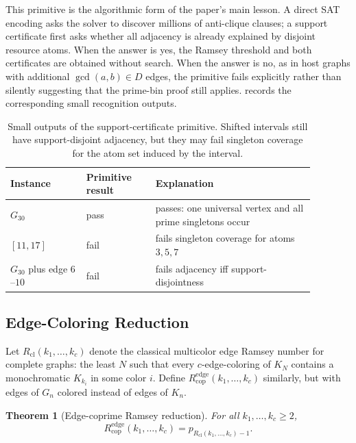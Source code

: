 \documentclass[11pt]{article}
\theoremstyle{plain}
\newtheorem{theorem}{Theorem}[section]
\theoremstyle{definition}
\theoremstyle{remark}
\newcommand{\Redge}{R_{\mathrm{cop}}^{\mathrm{edge}}}
\newcommand{\Rcl}{R_{\mathrm{cl}}}
\begin{document}
This primitive is the algorithmic form of the paper's main lesson.  A direct
SAT encoding asks the solver to discover millions of anti-clique clauses; a
support certificate first asks whether all adjacency is already explained by
disjoint resource atoms.  When the answer is yes, the Ramsey threshold and
both certificates are obtained without search.  When the answer is no, as in
host graphs with additional $\gcd(a,b)\in D$ edges, the primitive fails
explicitly rather than silently suggesting that the prime-bin proof still
applies.   records the corresponding small
recognition outputs.

\begin{table}[htbp]
\centering
\caption{Small outputs of the support-certificate primitive.  Shifted
intervals still have support-disjoint adjacency, but they may fail singleton
coverage for the atom set induced by the interval.}
\label{tab:support-primitive}
\small
\begin{tabular}{@{}>{\raggedright\arraybackslash}p{0.22\linewidth}>{\raggedright\arraybackslash}p{0.20\linewidth}>{\raggedright\arraybackslash}p{0.46\linewidth}@{}}
\toprule
Instance & Primitive result & Explanation \\
\midrule
$G_{30}$ & pass & passes: one universal vertex and all prime singletons occur \\
$[11,17]$ & fail & fails singleton coverage for atoms $3,5,7$ \\
$G_{30}$ plus edge $6$--$10$ & fail & fails adjacency iff support-disjointness \\
\bottomrule
\end{tabular}

\end{table}

\subsection{Edge-Coloring Reduction}

Let $\Rcl(k_1,\ldots,k_c)$ denote the classical multicolor edge Ramsey number
for complete graphs: the least $N$ such that every $c$-edge-coloring of
$K_N$ contains a monochromatic $K_{k_i}$ in some color $i$.  Define
$\Redge(k_1,\ldots,k_c)$ similarly, but with edges of $G_n$ colored instead
of edges of $K_n$.

\begin{theorem}[Edge-coprime Ramsey reduction]
\label{thm:edge-reduction}
For all $k_1,\ldots,k_c\ge 2$,
\[
  \Redge(k_1,\ldots,k_c)=p_{\Rcl(k_1,\ldots,k_c)-1}.
\]
\end{theorem}
\end{document}
